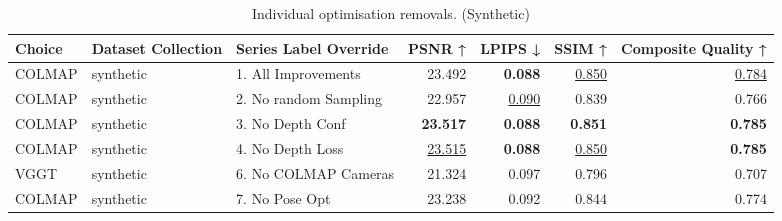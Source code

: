 \begin{table}[H]
\caption{\ifdefined\customcaption \customcaption \else Individual optimisation removals. (Synthetic) \fi}
\label{tab:99_all_improvements_removals_synthetic}
\centering
\scriptsize
\begin{tabular}{lllrrrr}
\toprule
Choice & Dataset Collection & Series Label Override & PSNR ↑ & LPIPS ↓ & SSIM ↑ & Composite Quality ↑ \\
\midrule
COLMAP & synthetic & 1. All Improvements & 23.492 & \textbf{0.088} & \underline{0.850} & \underline{0.784} \\
COLMAP & synthetic & 2. No random Sampling & 22.957 & \underline{0.090} & 0.839 & 0.766 \\
COLMAP & synthetic & 3. No Depth Conf & \textbf{23.517} & \textbf{0.088} & \textbf{0.851} & \textbf{0.785} \\
COLMAP & synthetic & 4. No Depth Loss & \underline{23.515} & \textbf{0.088} & \underline{0.850} & \textbf{0.785} \\
VGGT & synthetic & 6. No COLMAP Cameras & 21.324 & 0.097 & 0.796 & 0.707 \\
COLMAP & synthetic & 7. No Pose Opt & 23.238 & 0.092 & 0.844 & 0.774 \\
\bottomrule
\end{tabular}
\end{table}